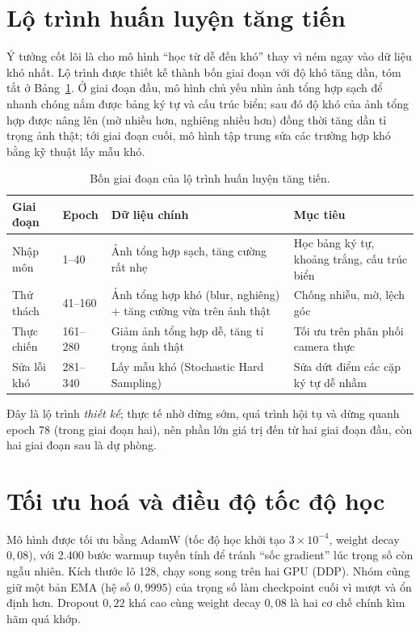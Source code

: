 \documentclass[12pt,a4paper]{report}
\begin{document}
\section{Lộ trình huấn luyện tăng tiến}
Ý tưởng cốt lõi là cho mô hình ``học từ dễ đến khó'' thay vì ném ngay vào dữ liệu khó nhất. Lộ trình được thiết kế thành bốn giai đoạn với độ khó tăng dần, tóm tắt ở Bảng~\ref{tab:curri}. Ở giai đoạn đầu, mô hình chủ yếu nhìn ảnh tổng hợp sạch để nhanh chóng nắm được bảng ký tự và cấu trúc biển; sau đó độ khó của ảnh tổng hợp được nâng lên (mờ nhiều hơn, nghiêng nhiều hơn) đồng thời tăng dần tỉ trọng ảnh thật; tới giai đoạn cuối, mô hình tập trung sửa các trường hợp khó bằng kỹ thuật lấy mẫu khó.

\begin{table}[H]
\centering
\caption{Bốn giai đoạn của lộ trình huấn luyện tăng tiến.}
\label{tab:curri}
\begin{tabular}{p{2.2cm}p{1.9cm}p{4.5cm}p{4.0cm}}
\toprule
\textbf{Giai đoạn} & \textbf{Epoch} & \textbf{Dữ liệu chính} & \textbf{Mục tiêu} \\
\midrule
Nhập môn & 1--40 & Ảnh tổng hợp sạch, tăng cường rất nhẹ & Học bảng ký tự, khoảng trắng, cấu trúc biển \\
Thử thách & 41--160 & Ảnh tổng hợp khó (blur, nghiêng) + tăng cường vừa trên ảnh thật & Chống nhiễu, mờ, lệch góc \\
Thực chiến & 161--280 & Giảm ảnh tổng hợp dễ, tăng tỉ trọng ảnh thật & Tối ưu trên phân phối camera thực \\
Sửa lỗi khó & 281--340 & Lấy mẫu khó (Stochastic Hard Sampling) & Sửa dứt điểm các cặp ký tự dễ nhầm \\
\bottomrule
\end{tabular}
\end{table}

Đây là lộ trình \emph{thiết kế}; thực tế nhờ dừng sớm, quá trình hội tụ và dừng quanh epoch 78 (trong giai đoạn hai), nên phần lớn giá trị đến từ hai giai đoạn đầu, còn hai giai đoạn sau là dự phòng.

\section{Tối ưu hoá và điều độ tốc độ học}
Mô hình được tối ưu bằng AdamW (tốc độ học khởi tạo $3\times10^{-4}$, weight decay $0{,}08$), với 2.400 bước warmup tuyến tính để tránh ``sốc gradient'' lúc trọng số còn ngẫu nhiên. Kích thước lô 128, chạy song song trên hai GPU (DDP). Nhóm cũng giữ một bản EMA (hệ số $0{,}9995$) của trọng số làm checkpoint cuối vì mượt và ổn định hơn. Dropout $0{,}22$ khá cao cùng weight decay $0{,}08$ là hai cơ chế chính kìm hãm quá khớp.
\end{document}
